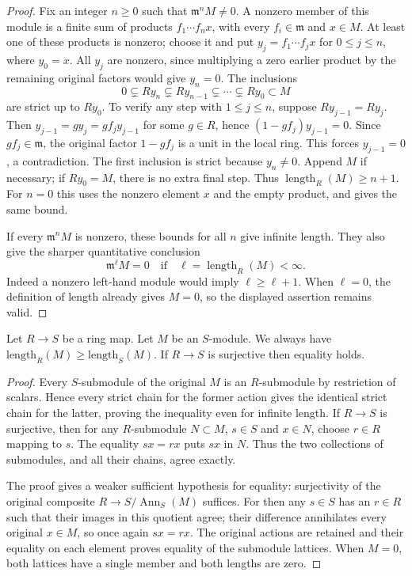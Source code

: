 \begin{proof}
Fix an integer $n\geq0$ such that $\mathfrak m^nM\neq0$.
A nonzero member of this module is a finite sum of products
$f_1\cdots f_nx$, with every $f_i\in\mathfrak m$ and $x\in M$.
At least one of these products is nonzero; choose it and put
$y_j=f_1\cdots f_jx$ for $0\leq j\leq n$, where $y_0=x$.
All $y_j$ are nonzero, since multiplying a zero earlier product
by the remaining original factors would give $y_n=0$.
The inclusions
$$
0\subsetneq Ry_n\subsetneq Ry_{n-1}\subsetneq\cdots
\subsetneq Ry_0\subset M
$$
are strict up to $Ry_0$. To verify any step with $1\leq j\leq n$,
suppose $Ry_{j-1}=Ry_j$. Then
$y_{j-1}=g y_j=g f_j y_{j-1}$ for some $g\in R$, hence
$(1-gf_j)y_{j-1}=0$. Since $gf_j\in\mathfrak m$, the original
factor $1-gf_j$ is a unit in the local ring. This forces
$y_{j-1}=0$, a contradiction. The first inclusion is strict
because $y_n\neq0$. Append $M$ if necessary; if $Ry_0=M$,
there is no extra final step. Thus
$\operatorname{length}_R(M)\geq n+1$.
For $n=0$ this uses the nonzero element $x$ and the empty product,
and gives the same bound.

If every $\mathfrak m^nM$ is nonzero, these bounds for all $n$
give infinite length. They also give the sharper quantitative
conclusion
$$
\mathfrak m^\ell M=0
\quad\text{if}\quad
\ell=\operatorname{length}_R(M)<\infty.
$$
Indeed a nonzero left-hand module would imply
$\ell\geq\ell+1$. When $\ell=0$, the definition of length
already gives $M=0$, so the displayed assertion remains valid.
\end{proof}

\begin{lemma}
\label{editorial-source-lemma-length-independent}
Let $R \to S$ be a ring map. Let $M$ be an $S$-module.
We always have $\text{length}_R(M) \geq \text{length}_S(M)$.
If $R \to S$ is surjective then equality holds.
\end{lemma}

\begin{proof}
Every $S$-submodule of the original $M$ is an $R$-submodule by
restriction of scalars. Hence every strict chain for the former
action gives the identical strict chain for the latter, proving
the inequality even for infinite length.
If $R\to S$ is surjective, then for any $R$-submodule $N\subset M$,
$s\in S$ and $x\in N$, choose $r\in R$ mapping to $s$.
The equality $sx=rx$ puts $sx$ in $N$. Thus the two collections
of submodules, and all their chains, agree exactly.

The proof gives a weaker sufficient hypothesis for equality:
surjectivity of the original composite
$R\to S/\operatorname{Ann}_S(M)$ suffices.
For then any $s\in S$ has an $r\in R$ such that their images
in this quotient agree; their difference annihilates every
original $x\in M$, so once again $sx=rx$.
The original actions are retained and their equality on each
element proves equality of the submodule lattices. When $M=0$,
both lattices have a single member and both lengths are zero.
\end{proof}

